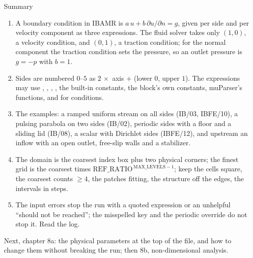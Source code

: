 \documentclass[aspectratio=169,11pt]{beamer}
\begin{document}
\begin{frame}{Summary}
\label{fr:summary}
\footnotesize
\begin{enumerate}
  \item A boundary condition in IBAMR is $a\,u + b\,\partial u/\partial n = g$, given per side and per velocity component as three expressions. The fluid solver takes only $(1, 0)$, a velocity condition, and $(0, 1)$, a traction condition; for the normal component the traction condition sets the pressure, so an outlet pressure is $g = -p$ with $b = 1$.
  \item Sides are numbered $0$--$5$ as $2\,\times$ axis $+$ (lower $0$, upper $1$). The expressions may use , , , , the built-in constants, the block's own constants, muParser's functions, and  for conditions.
  \item The examples: a ramped uniform stream on all sides (IB/03, IBFE/10), a pulsing parabola on two sides (IB/02), periodic sides with a floor and a sliding lid (IB/08), a scalar with Dirichlet sides (IBFE/12), and upstream an inflow with an open outlet, free-slip walls and a stabilizer.
  \item The domain is the coarsest index box plus two physical corners; the finest grid is the coarsest times $\mathrm{REF\_RATIO}^{\,\mathrm{MAX\_LEVELS}-1}$; keep the cells square, the coarsest counts $\ge 4$, the patches fitting, the structure off the edges, the intervals in steps.
  \item The input errors stop the run with a quoted expression or an unhelpful ``should not be reached''; the misspelled key and the periodic override do not stop it. Read the log.
\end{enumerate}
\vspace{1mm}
\begin{homebox}
\footnotesize Next, chapter 8a: the physical parameters at the top of the file, and how to change them without breaking the run; then 8b, non-dimensional analysis.
\end{homebox}
\end{frame}
\end{document}
